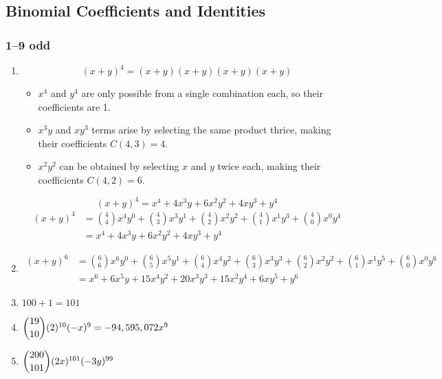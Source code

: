 \documentclass[12pt, A4]{article}
\begin{document}
		\subsection{Binomial Coefficients and Identities}
			\subsubsection*{1--9 odd}
				\begin{enumerate}
					\item
						\begin{tasks}
							\task
								\[(x + y)^4 = (x + y)(x + y)(x + y)(x + y)\]
								\begin{itemize}[leftmargin = -0.25in]
									\item
										\(x^4\) and \(y^4\) are only possible from a single combination each, so their coefficients are 1.	
									\item
										\(x^3y\) and \(xy^3\) terms arise by selecting the same product thrice, making their coefficients \(C(4, 3) = 4\).
									\item
										\(x^2y^2\) can be obtained by selecting \(x\) and \(y\) twice each, making their coefficients \(C(4, 2) = 6\).
								\end{itemize}
								\[(x + y)^4 = x^4 + 4x^3y + 6x^2y^2 + 4xy^3 + y^4\]
							\task
								\begin{align*}
									(x + y)^4 &= \binom{4}{4}x^4y^0 + \binom{4}{3}x^3y^1 + \binom{4}{2}x^2y^2 + \binom{4}{1}x^1y^3 + \binom{4}{0}x^0y^4 \\
										&= x^4 + 4x^3y + 6x^2y^2 + 4xy^3 + y^4
								\end{align*}
						\end{tasks}
					\setcounter{enumi}{2}
					\item
						\begin{align*}
							(x + y)^6 &= \binom{6}{6}x^6y^0 + \binom{6}{5}x^5y^1 + \binom{6}{4}x^4y^2 + \binom{6}{3}x^3y^3 + \binom{6}{2}x^2y^2 + \binom{6}{1}x^1y^5 + \binom{6}{0}x^0y^6 \\
								&= x^6 + 6x^5y + 15x^4y^2 + 20x^3y^3 + 15x^2y^4 + 6xy^5 + y^6
						\end{align*}
					\setcounter{enumi}{4}
					\item
						\(100 + 1 = 101\)
					\setcounter{enumi}{6}
					\item
						\(\dbinom{19}{10}(2)^{10}(-x)^{9} = -94,595,072x^9\)
					\item
						\(\dbinom{200}{101}(2x)^{101}(-3y)^{99}\)
				\end{enumerate}
\end{document}
